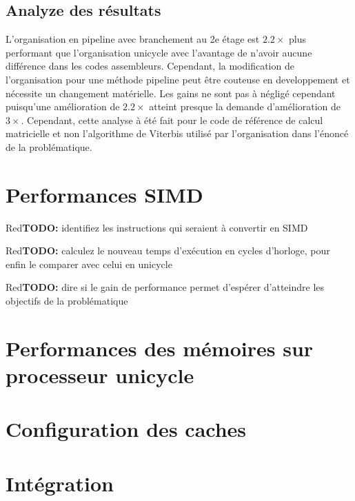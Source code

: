 \documentclass[a11paper]{article}
\newcommand{\todo}[1]{\begin{color}{Red}\textbf{TODO:} #1\end{color}}
\begin{document}
\subsection{Analyze des résultats}
L'organisation en pipeline avec branchement au 2e étage est $2.2\times$ plus performant que l'organisation unicycle avec l'avantage de n'avoir aucune différence dans les codes assembleurs.
Cependant, la modification de l'organisation pour une méthode pipeline peut être couteuse en developpement et nécessite un changement matérielle. Les gains ne sont pas à négligé cependant puisqu'une
amélioration de $2.2\times$ atteint presque la demande d'amélioration de $3\times$. Cependant, cette analyse à été fait pour le code de référence de calcul matricielle et non l'algorithme de Viterbis
utilisé par l'organisation dans l'énoncé de la problématique.


\section{Performances SIMD}

\todo{identifiez les instructions qui seraient à convertir en SIMD}

\todo{calculez le nouveau temps d'exécution en cycles d'horloge, pour enfin le
comparer avec celui en unicycle}

\todo{dire si le gain de performance permet d'espérer d'atteindre les objectifs
de la problématique}

\section{Performances des mémoires sur processeur unicycle}

\section{Configuration des caches}

\section{Intégration}
\end{document}
